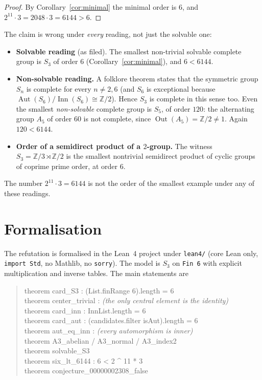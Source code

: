 \documentclass[11pt]{article}
\theoremstyle{definition}
\theoremstyle{remark}
\newcommand{\Aut}{\operatorname{Aut}}
\newcommand{\Inn}{\operatorname{Inn}}
\newcommand{\Out}{\operatorname{Out}}
\newcommand{\Z}{\mathbb{Z}}
\newcommand{\Zc}[1]{\Z/#1}
\newcommand{\Sthree}{S_3}
\begin{document}
\begin{proof}
By Corollary~\ref{cor:minimal} the minimal order is $6$, and
$2^{11}\cdot 3 = 2048 \cdot 3 = 6144 > 6$.
\end{proof}

The claim is wrong under \emph{every} reading, not just the solvable one:

\begin{itemize}
\item \textbf{Solvable reading} (as filed). The smallest non-trivial solvable
  complete group is $\Sthree$ of order $6$ (Corollary~\ref{cor:minimal}), and
  $6 < 6144$.
\item \textbf{Non-solvable reading.} A folklore theorem states that the
  symmetric group $S_n$ is complete for every $n \neq 2, 6$ (and $S_6$ is
  exceptional because $\Aut(S_6)/\Inn(S_6) \cong \Zc{2}$). Hence
  $\Sthree$ is complete in this sense too. Even the smallest \emph{non-solvable}
  complete group is $S_5$, of order $120$: the alternating group $A_5$ of order
  $60$ is not complete, since $\Out(A_5) = \Zc{2} \neq 1$. Again $120 < 6144$.
\item \textbf{Order of a semidirect product of a $2$-group.} The witness
  $\Sthree = \Zc{3} \rtimes \Zc{2}$ is the smallest nontrivial semidirect
  product of cyclic groups of coprime prime order, at order $6$.
\end{itemize}

The number $2^{11}\cdot 3 = 6144$ is not the order of the smallest example under
any of these readings.

\section{Formalisation}

The refutation is formalised in the Lean~4 project under \texttt{lean4/}
(core Lean only, \texttt{import Std}, no Mathlib, no \texttt{sorry}). The model
is $\Sthree$ on \texttt{Fin 6} with explicit multiplication and inverse tables.
The main statements are

\begin{quote}\ttfamily
theorem card\_S3 : (List.finRange 6).length = 6\\
theorem center\_trivial : \textit{(the only central element is the identity)}\\
theorem card\_inn : InnList.length = 6\\
theorem card\_aut : (candidates.filter isAut).length = 6\\
theorem aut\_eq\_inn : \textit{(every automorphism is inner)}\\
theorem A3\_abelian / A3\_normal / A3\_index2\\
theorem solvable\_S3\\
theorem six\_lt\_6144 : 6 < 2 \^{} 11 * 3\\
theorem conjecture\_00000002308\_false
\end{quote}
\end{document}
